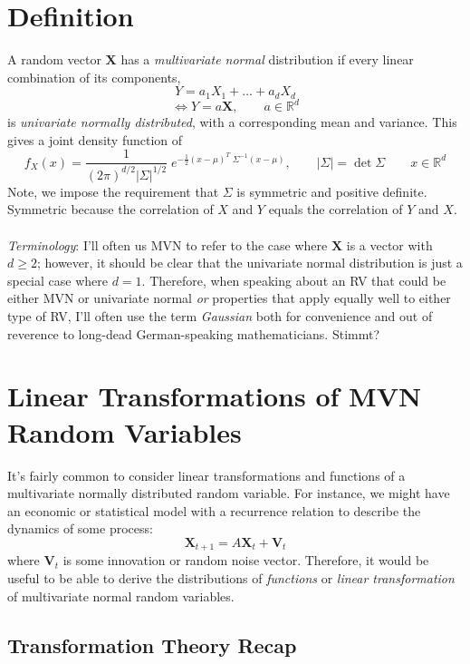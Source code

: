 \documentclass[a4paper,12pt]{scrartcl}
\begin{document}
\newpage
\section{Definition}

A random vector $\mathbf{X}$ has a \emph{multivariate normal} 
distribution if every linear combination of its components,
\[ Y = a_1 X_1 + \ldots + a_d X_d \] 
\[ \Leftrightarrow Y = {a} \mathbf{X}, \qquad
    {a} \in \mathbb{R}^{d} \]
is \emph{univariate normally
distributed}, with a corresponding mean and variance. This gives a 
joint density function of 
\begin{equation}
    \label{pdf}
   f_{X}({x}) = \frac{1}{(2\pi)^{d/2}\lvert \Sigma \rvert^{1/2}} 
	\; e^{ -\frac{1}{2} ({x} - \mu)^T \;
	\Sigma^{-1} ({x} - \mu) }, \qquad \lvert\Sigma\rvert =
      \det\Sigma \qquad x \in \mathbb{R}^d
\end{equation}
Note, we impose the requirement that $\Sigma$ is symmetric and positive 
definite.  Symmetric because the correlation of $X$ and $Y$ equals the
correlation of $Y$ and $X$. 
\\
\\
{\sl Terminology}: I'll often us MVN to refer to the case where $\mathbf{X}$ is
a vector with $d\geq2$; however, it should be clear that the univariate
normal distribution is just a special case where $d=1$. Therefore,
when speaking about an RV that could be either MVN or univariate normal
\emph{or} properties that apply equally well to either
type of RV, I'll often use the term \emph{Gaussian}
both for convenience and out of reverence to long-dead German-speaking
mathematicians. Stimmt?


\section{Linear Transformations of MVN Random Variables}

It's fairly common to consider linear transformations and functions
of a multivariate normally distributed random variable.  For instance,
we might have an economic or statistical model with a recurrence 
relation to describe the dynamics of some process:
\[ \mathbf{X}_{t+1} = A \mathbf{X}_{t} + \mathbf{V}_{t} \]
where $\mathbf{V}_t$ is some innovation or random noise vector.
Therefore, it would be useful to be able to derive the distributions
of \emph{functions} or \emph{linear transformation} of multivariate 
normal random variables.

\subsection{Transformation Theory Recap}
\end{document}
